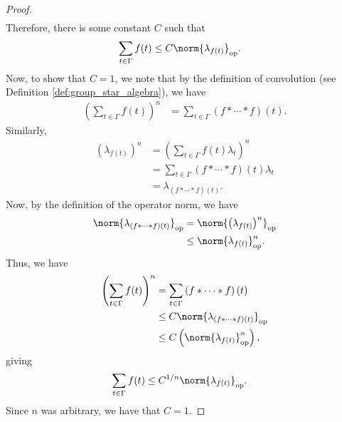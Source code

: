\begin{proof}
\begin{align*}
  \end{align*}
  Therefore, there is some constant $C$ such that
  \begin{align*}
    \sum_{t\in\Gamma}f(t) &\leq C\norm{\lambda_{f(t)}}_{\op}.
  \end{align*}
  Now, to show that $C = 1$, we note that by the definition of convolution (see Definition \ref{def:group_star_algebra}), we have
  \begin{align*}
    \left( \sum_{t\in\Gamma}f(t) \right)^{n} &= \sum_{t\in\Gamma}\left( f\ast\cdots\ast f \right)\left( t \right).
  \end{align*}
  Similarly,
  \begin{align*}
    \left( \lambda_{f(t)} \right)^n &= \left( \sum_{t\in\Gamma}f(t)\lambda_t \right)^{n}\\
                                    &= \sum_{t\in\Gamma}\left( f\ast\cdots\ast f \right)\left( t \right)\lambda_t\\
                                    &= \lambda_{(f\ast\cdots\ast f)(t)}.
  \end{align*}
  Now, by the definition of the operator norm, we have
  \begin{align*}
    \norm{\lambda_{(f\ast\cdots\ast f)(t)}}_{\op} &= \norm{\left( \lambda_{f(t)} \right)^n}_{\op}\\
                                                    &\leq \norm{\lambda_{f(t)}}_{\op}^{n}.
  \end{align*}
  Thus, we have
  \begin{align*}
    \left( \sum_{t\in\Gamma}f(t) \right)^n &= \sum_{t\in\Gamma}\left( f\ast\cdots\ast f \right)\left( t \right)\\
                                           &\leq C\norm{\lambda_{\left( f\ast\cdots\ast f \right)\left( t \right)}}_{\op}\\
                                           &\leq C\left( \norm{\lambda_{f(t)}}_{\op}^n \right),
  \end{align*}
  giving
  \begin{align*}
    \sum_{t\in\Gamma}f(t) &\leq C^{1/n}\norm{\lambda_{f(t)}}_{\op}.
  \end{align*}
  Since $n$ was arbitrary, we have that $C = 1$.\newline


\end{proof}
